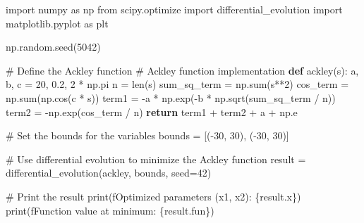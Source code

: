 \documentclass[
  letterpaper,
  DIV=11,
  numbers=noendperiod]{scrreprt}
\newenvironment{Shaded}{\begin{snugshade}}{\end{snugshade}}
\newcommand{\BuiltInTok}[1]{\textcolor[rgb]{0.00,0.23,0.31}{#1}}
\newcommand{\CommentTok}[1]{\textcolor[rgb]{0.37,0.37,0.37}{#1}}
\newcommand{\ControlFlowTok}[1]{\textcolor[rgb]{0.00,0.23,0.31}{\textbf{#1}}}
\newcommand{\DecValTok}[1]{\textcolor[rgb]{0.68,0.00,0.00}{#1}}
\newcommand{\FloatTok}[1]{\textcolor[rgb]{0.68,0.00,0.00}{#1}}
\newcommand{\ImportTok}[1]{\textcolor[rgb]{0.00,0.46,0.62}{#1}}
\newcommand{\KeywordTok}[1]{\textcolor[rgb]{0.00,0.23,0.31}{\textbf{#1}}}
\newcommand{\NormalTok}[1]{\textcolor[rgb]{0.00,0.23,0.31}{#1}}
\newcommand{\OperatorTok}[1]{\textcolor[rgb]{0.37,0.37,0.37}{#1}}
\newcommand{\SpecialCharTok}[1]{\textcolor[rgb]{0.37,0.37,0.37}{#1}}
\newcommand{\SpecialStringTok}[1]{\textcolor[rgb]{0.13,0.47,0.30}{#1}}
\begin{document}
\begin{Shaded}
\begin{Highlighting}[]
\ImportTok{import}\NormalTok{ numpy }\ImportTok{as}\NormalTok{ np}
\ImportTok{from}\NormalTok{ scipy.optimize }\ImportTok{import}\NormalTok{ differential\_evolution}
\ImportTok{import}\NormalTok{ matplotlib.pyplot }\ImportTok{as}\NormalTok{ plt}

\NormalTok{np.random.seed(}\DecValTok{5042}\NormalTok{)}

\CommentTok{\# Define the Ackley function}
\CommentTok{\# Ackley function implementation}
\KeywordTok{def}\NormalTok{ ackley(s):}
\NormalTok{    a, b, c }\OperatorTok{=} \DecValTok{20}\NormalTok{, }\FloatTok{0.2}\NormalTok{, }\DecValTok{2} \OperatorTok{*}\NormalTok{ np.pi}
\NormalTok{    n }\OperatorTok{=} \BuiltInTok{len}\NormalTok{(s)}
\NormalTok{    sum\_sq\_term }\OperatorTok{=}\NormalTok{ np.}\BuiltInTok{sum}\NormalTok{(s}\OperatorTok{**}\DecValTok{2}\NormalTok{)}
\NormalTok{    cos\_term }\OperatorTok{=}\NormalTok{ np.}\BuiltInTok{sum}\NormalTok{(np.cos(c }\OperatorTok{*}\NormalTok{ s))}
\NormalTok{    term1 }\OperatorTok{=} \OperatorTok{{-}}\NormalTok{a }\OperatorTok{*}\NormalTok{ np.exp(}\OperatorTok{{-}}\NormalTok{b }\OperatorTok{*}\NormalTok{ np.sqrt(sum\_sq\_term }\OperatorTok{/}\NormalTok{ n))}
\NormalTok{    term2 }\OperatorTok{=} \OperatorTok{{-}}\NormalTok{np.exp(cos\_term }\OperatorTok{/}\NormalTok{ n)}
    \ControlFlowTok{return}\NormalTok{ term1 }\OperatorTok{+}\NormalTok{ term2 }\OperatorTok{+}\NormalTok{ a }\OperatorTok{+}\NormalTok{ np.e}

\CommentTok{\# Set the bounds for the variables }
\NormalTok{bounds }\OperatorTok{=}\NormalTok{ [(}\OperatorTok{{-}}\DecValTok{30}\NormalTok{, }\DecValTok{30}\NormalTok{), (}\OperatorTok{{-}}\DecValTok{30}\NormalTok{, }\DecValTok{30}\NormalTok{)]}

\CommentTok{\# Use differential evolution to minimize the Ackley function}
\NormalTok{result }\OperatorTok{=}\NormalTok{ differential\_evolution(ackley, bounds, seed}\OperatorTok{=}\DecValTok{42}\NormalTok{)}

\CommentTok{\# Print the result}
\BuiltInTok{print}\NormalTok{(}\SpecialStringTok{f\textquotesingle{}Optimized parameters (x1, x2): }\SpecialCharTok{\{}\NormalTok{result}\SpecialCharTok{.}\NormalTok{x}\SpecialCharTok{\}}\SpecialStringTok{\textquotesingle{}}\NormalTok{)}
\BuiltInTok{print}\NormalTok{(}\SpecialStringTok{f\textquotesingle{}Function value at minimum: }\SpecialCharTok{\{}\NormalTok{result}\SpecialCharTok{.}\NormalTok{fun}\SpecialCharTok{\}}\SpecialStringTok{\textquotesingle{}}\NormalTok{)}



\end{Highlighting}
\end{Shaded}
\end{document}
